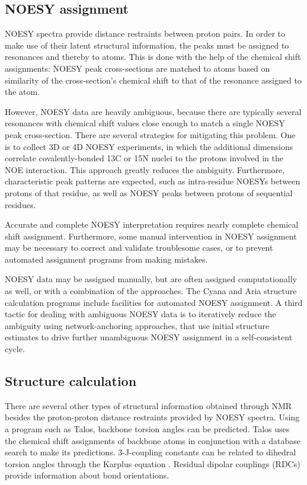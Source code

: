 \subsection*{NOESY assignment}

NOESY spectra provide distance restraints between proton pairs.  In order to
make use of their latent structural information, the peaks must be assigned
to resonances and thereby to atoms.  This is done with the help of the 
chemical shift assignments: NOESY peak cross-sections are matched to atoms
based on similarity of the cross-section's chemical shift to that of the
resonance assigned to the atom.

However, NOESY data are heavily ambiguous, because there are typically several
resonances with chemical shift values close enough to match a single NOESY
peak cross-section.  There are several strategies for mitigating this problem.
One is to collect 3D or 4D NOESY experiments, in which the additional dimensions
correlate covalently-bonded 13C or 15N nuclei to the protons involved in the
NOE interaction.  This approach greatly reduces the ambiguity.  Furthermore,
characteristic peak patterns are expected, such as intra-residue NOESYs between
protons of that residue, as well as NOESY peaks between protons of sequential
residues.

Accurate and complete NOESY interpretation requires nearly complete chemical
shift assignment.  Furthermore, some manual intervention in NOESY assignment
may be necessary to correct and validate troublesome cases, or to prevent
automated assignment programs from making mistakes.

NOESY data may be assigned manually, but are often assigned computationally
as well, or with a combination of the approaches.  The Cyana and Aria structure 
calculation programs include facilities for automated NOESY assignment.  A
third tactic for dealing with ambiguous NOESY data is to iteratively reduce the
ambiguity using network-anchoring approaches, that use initial structure 
estimates to drive further unambiguous NOESY assignment in a self-consistent
cycle.

\subsection*{Structure calculation}

There are several other types of structural information obtained through NMR
besides the proton-proton distance restraints provided by NOESY spectra.
Using a program such as Talos, backbone torsion angles can be predicted.  Talos
uses the chemical shift assignments of backbone atoms in conjunction with a
database search to make its predictions.  3-J-coupling constants can be 
related to dihedral torsion angles through the Karplus equation
\cite{karplus1959contact, karplus1963vicinal}.  Residual dipolar couplings
(RDCs) provide information about bond orientations.

